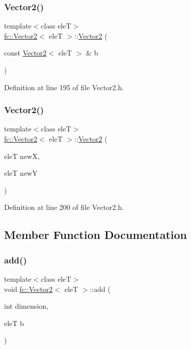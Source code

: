 \subsubsection{\texorpdfstring{Vector2()}{Vector2()}\hspace{0.1cm}{\footnotesize\ttfamily [2/3]}}
{\footnotesize\ttfamily template$<$class eleT$>$ \\
\hyperlink{classfc_1_1Vector2}{fc\+::\+Vector2}$<$ eleT $>$\+::\hyperlink{classfc_1_1Vector2}{Vector2} (\begin{DoxyParamCaption}\item[{const \hyperlink{classfc_1_1Vector2}{Vector2}$<$ eleT $>$ \&}]{b }\end{DoxyParamCaption})}



Definition at line 195 of file Vector2.\+h.

\mbox{\label{classfc_1_1Vector2_aa48168c3d2b43e6f129ec93edfa1cb24}} 
\subsubsection{\texorpdfstring{Vector2()}{Vector2()}\hspace{0.1cm}{\footnotesize\ttfamily [3/3]}}
{\footnotesize\ttfamily template$<$class eleT$>$ \\
\hyperlink{classfc_1_1Vector2}{fc\+::\+Vector2}$<$ eleT $>$\+::\hyperlink{classfc_1_1Vector2}{Vector2} (\begin{DoxyParamCaption}\item[{eleT}]{newX,  }\item[{eleT}]{newY }\end{DoxyParamCaption})}



Definition at line 200 of file Vector2.\+h.



\subsection{Member Function Documentation}
\mbox{\label{classfc_1_1Vector2_a7bc6143a3005d1b8ff35bea3c3f89c3d}} 
\subsubsection{\texorpdfstring{add()}{add()}}
{\footnotesize\ttfamily template$<$class eleT$>$ \\
void \hyperlink{classfc_1_1Vector2}{fc\+::\+Vector2}$<$ eleT $>$\+::add (\begin{DoxyParamCaption}\item[{int}]{dimension,  }\item[{eleT}]{b }\end{DoxyParamCaption})}



